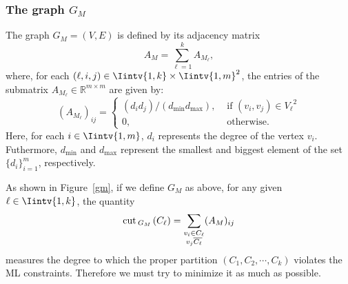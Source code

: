 \subsubsection*{The graph $G_M$}

\begin{definition}
   The graph $G_M = (V,E)$ is defined by its adjacency matrix 
   \begin{equation}\label{am}
   A_M = \sum_{\ell = 1}^k A_{M_{\ell}},
\end{equation}
   where, for each $(\ell, i, j) \in \Iintv{1,k} \times \Iintv{1, m}^2$, the entries of the submatrix $A_{M_{\ell}} \in \mathbb R^{m \times m}$ are given by:
   \begin{equation}
      (A_{M_{\ell}})_{ij} =
      \begin{cases}
         (d_i d_j) / (d_{\min} d_{\max}), & \text{ if $(v_i, v_j) \in {V_{\ell}}^2$} \\
         0, & \text{ otherwise.}
      \end{cases}
\end{equation}
Here, for each $i \in \Iintv{1,m}$, $d_i$ represents the degree of the vertex $v_i$. 
Futhermore, $d_{\min}$ and $d_{\max}$ represent the smallest and biggest element of the set $\{ d_i \}_{i=1}^m$, respectively.
\end{definition}

As shown in Figure~\vref{gm}, if we define $G_M$ as above, for any given $\ell \in \Iintv{1,k}$, the quantity
\begin{equation}
   \operatorname{cut\,}_{G_M\,}(C_{\ell}) = \sum_{\substack{v_i \in C_{\ell} \\ v_j \overline{C_{\ell}}}} (A_M)_{ij} 
\end{equation}
measures the degree to which the proper partition $(C_1, C_2, \cdots, C_k)$ violates the ML constraints.
Therefore we must try to minimize it as much as possible.

